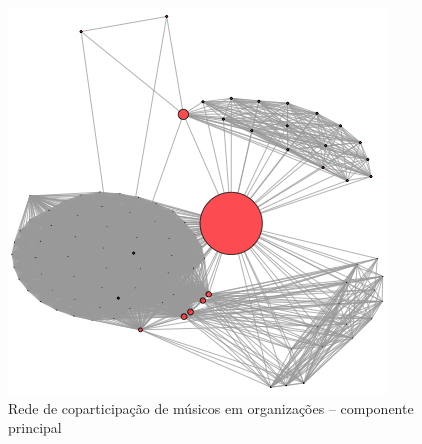 \documentclass[a4paper, 12pt, openright, oneside, german, french, english, brazil]{abntex2}
\begin{document}
	
	\begin{figure}[!ht]
		\centering
		\caption{Rede de coparticipação de músicos em organizações -- componente principal}
		\label{rede:coparticipacao}
		\includegraphics[scale=.7]{mesonivel1.png}
	\end{figure}
	
	
	
	


		
\end{document}

